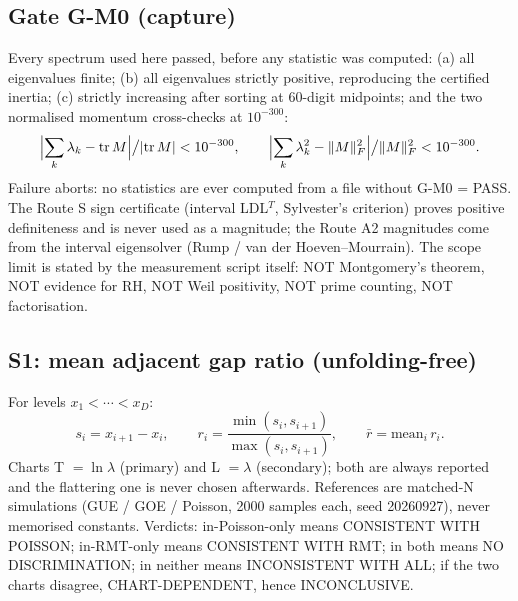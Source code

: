 \documentclass[11pt]{article}
\begin{document}
\subsection{Gate G-M0 (capture)}
Every spectrum used here passed, before any statistic was computed:
(a) all eigenvalues finite; (b) all eigenvalues strictly positive,
reproducing the certified inertia; (c) strictly increasing after sorting
at 60-digit midpoints; and the two normalised momentum cross-checks at
$10^{-300}$:
\begin{equation*}
\Bigl|\sum_k \lambda_k - \mathrm{tr}\,M\Bigr| \big/ |\mathrm{tr}\,M|
< 10^{-300},
\qquad
\Bigl|\sum_k \lambda_k^{2} - \|M\|_F^{2}\Bigr| \big/ \|M\|_F^{2}
< 10^{-300}.
\end{equation*}
Failure aborts: no statistics are ever computed from a file without
G-M0 = PASS. The Route S sign certificate (interval LDL$^T$,
Sylvester's criterion) proves positive definiteness and is never used as
a magnitude; the Route A2 magnitudes come from the interval eigensolver
(Rump / van der Hoeven--Mourrain). The scope limit is stated by the
measurement script itself: NOT Montgomery's theorem, NOT evidence for
RH, NOT Weil positivity, NOT prime counting, NOT factorisation.

\subsection{S1: mean adjacent gap ratio (unfolding-free)}
For levels $x_1 < \cdots < x_D$:
\begin{equation*}
s_i = x_{i+1} - x_i, \qquad
r_i = \frac{\min(s_i, s_{i+1})}{\max(s_i, s_{i+1})}, \qquad
\bar r = \mathrm{mean}_i\, r_i.
\end{equation*}
Charts T $= \ln \lambda$ (primary) and L $= \lambda$ (secondary); both
are always reported and the flattering one is never chosen afterwards.
References are matched-N simulations (GUE / GOE / Poisson, 2000 samples
each, seed 20260927), never memorised constants. Verdicts:
in-Poisson-only means CONSISTENT WITH POISSON; in-RMT-only means
CONSISTENT WITH RMT; in both means NO DISCRIMINATION; in neither means
INCONSISTENT WITH ALL; if the two charts disagree, CHART-DEPENDENT,
hence INCONCLUSIVE.
\end{document}
